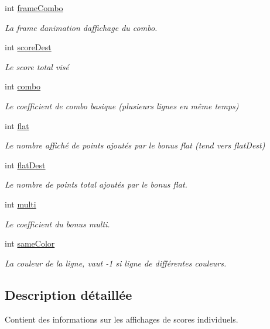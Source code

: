 \begin{DoxyCompactItemize}
int \hyperlink{struct_score_abe66f83d6c5bc7b3f0696b964e634f13}{frame\+Combo}
\begin{DoxyCompactList}\small\item\em La frame d\textquotesingle{}animation d\textquotesingle{}affichage du combo. \end{DoxyCompactList}\item 
int \hyperlink{struct_score_ae91e6e17b08d8e57fa76ef5d876d3159}{score\+Dest}
\begin{DoxyCompactList}\small\item\em Le score total visé \end{DoxyCompactList}\item 
int \hyperlink{struct_score_ae22d389a99bf914464ec06fbda7ccf0d}{combo}
\begin{DoxyCompactList}\small\item\em Le coefficient de combo basique (plusieurs lignes en même temps) \end{DoxyCompactList}\item 
int \hyperlink{struct_score_a66bc112fd9a6ba0826960e9d5bf3913b}{flat}
\begin{DoxyCompactList}\small\item\em Le nombre affiché de points ajoutés par le bonus flat (tend vers flat\+Dest) \end{DoxyCompactList}\item 
int \hyperlink{struct_score_acf6a92022c51593eea83f33aced7f0a9}{flat\+Dest}
\begin{DoxyCompactList}\small\item\em Le nombre de points total ajoutés par le bonus flat. \end{DoxyCompactList}\item 
int \hyperlink{struct_score_af57d7784cef50f04c462c81b01d20c41}{multi}
\begin{DoxyCompactList}\small\item\em Le coefficient du bonus multi. \end{DoxyCompactList}\item 
int \hyperlink{struct_score_a91ef7ce4e1bd708788a6b42cccdc298a}{same\+Color}
\begin{DoxyCompactList}\small\item\em La couleur de la ligne, vaut -\/1 si ligne de différentes couleurs. \end{DoxyCompactList}\end{DoxyCompactItemize}


\subsection{Description détaillée}
Contient des informations sur les affichages de scores individuels. 

